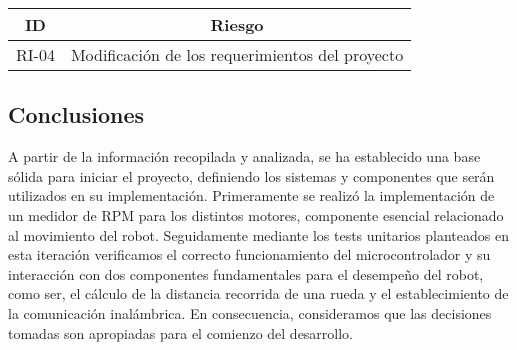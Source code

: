 \begin{center}
    \begin{tabular} {
        | c| c |}
        \hline \rowcolor{test_header_color}
            ID & Riesgo \\
        \hline
            RI-04 & Modificación de los requerimientos del proyecto\\
        \hline
    \end{tabular}
\end{center}

\subsection{Conclusiones}
A partir de la información recopilada y analizada, se ha establecido una base sólida para iniciar el proyecto, definiendo los sistemas y componentes que serán utilizados en su implementación.
Primeramente se realizó la implementación de un medidor de RPM para los distintos motores, componente esencial relacionado al movimiento del robot. Seguidamente mediante los tests unitarios planteados en esta iteración verificamos el correcto funcionamiento del microcontrolador y su interacción con dos componentes fundamentales para el desempeño del robot, como ser, el cálculo de la distancia recorrida de una rueda y el establecimiento de la comunicación inalámbrica.
En consecuencia, consideramos que las decisiones tomadas son apropiadas para el comienzo del desarrollo.